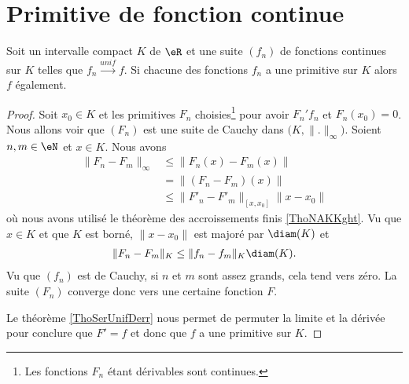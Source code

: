 \section{Primitive de fonction continue}

\begin{proposition}    \label{PropQACVooBnHtRJ}
    Soit un intervalle compact \( K\) de \( \eR\) et une suite \( (f_n)\) de fonctions continues sur \( K\) telles que \( f_n\stackrel{unif}{\longrightarrow}f\). Si chacune des fonctions \( f_n\) a une primitive sur \( K\) alors \( f\) également.
\end{proposition}

\begin{proof}
    Soit \( x_0\in K\) et les primitives \( F_n\) choisies\footnote{Les fonctions \( F_n\) étant dérivables sont continues.} pour avoir \( F_n'f_n\) et \( F_n(x_0)=0\). Nous allons voir que \( (F_n)\) est une suite de Cauchy dans \( \big( K,\| . \|_{\infty} \big)\). Soient \( n,m\in \eN\) et \( x\in K\). Nous avons
    \begin{subequations}
        \begin{align}
            \| F_n-F_m \|_{\infty}&\leq \| F_n(x)-F_m(x) \|\\
            &=\| (F_n-F_m)(x) \|\\
            &\leq \| F'_n-F'_m \|_{[x,x_0]}\| x-x_0 \|
        \end{align}
    \end{subequations}
    où nous avons utilisé le théorème des accroissements finis \ref{ThoNAKKght}. Vu que \( x\in K\) et que \( K\) est borné, \( \| x-x_0 \|\) est majoré par \( \diam(K)\) et
    \begin{subequations}
        \begin{align}
            \| F_n-F_m \|_K\leq \| f_n-f_m \|_K\diam(K).
        \end{align}
    \end{subequations}
    Vu que \( (f_n) \) est de Cauchy, si \( n\) et \( m\) sont assez grands, cela tend vers zéro. La suite \( (F_n)\) converge donc vers une certaine fonction \( F\).

    Le théorème \ref{ThoSerUnifDerr} nous permet de permuter la limite et la dérivée pour conclure que \( F'=f\) et donc que \( f\) a une primitive sur \( K\).
\end{proof}

